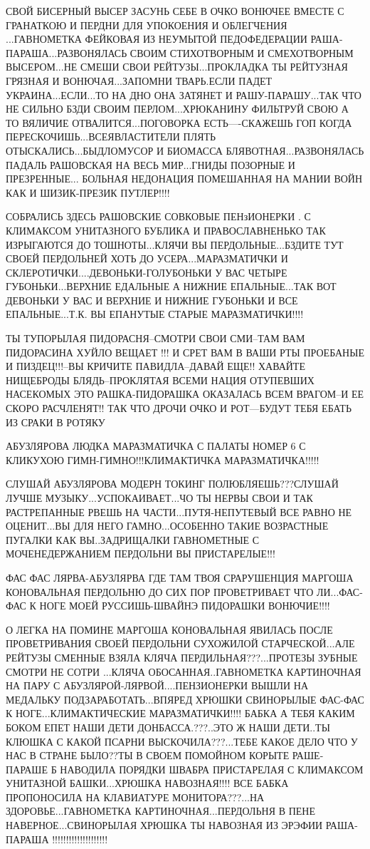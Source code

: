 СВОЙ БИСЕРНЫЙ ВЫСЕР ЗАСУНЬ СЕБЕ В ОЧКО ВОНЮЧЕЕ ВМЕСТЕ С ГРАНАТКОЮ И ПЕРДНИ ДЛЯ
УПОКОЕНИЯ И ОБЛЕГЧЕНИЯ ...ГАВНОМЕТКА ФЕЙКОВАЯ ИЗ НЕУМЫТОЙ ПЕДОФЕДЕРАЦИИ
РАША-ПАРАША...РАЗВОНЯЛАСЬ СВОИМ СТИХОТВОРНЫМ И СМЕХОТВОРНЫМ ВЫСЕРОМ...НЕ СМЕШИ
СВОИ РЕЙТУЗЫ...ПРОКЛАДКА ТЫ РЕЙТУЗНАЯ ГРЯЗНАЯ И ВОНЮЧАЯ...ЗАПОМНИ ТВАРЬ.ЕСЛИ
ПАДЕТ УКРАИНА...ЕСЛИ...ТО НА ДНО ОНА ЗАТЯНЕТ И РАШУ-ПАРАШУ...ТАК ЧТО НЕ СИЛЬНО
БЗДИ СВОИМ ПЕРЛОМ...ХРЮКАНИНУ ФИЛЬТРУЙ СВОЮ А ТО ВЯЛИЧИЕ ОТВАЛИТСЯ...ПОГОВОРКА
ЕСТЬ----СКАЖЕШЬ ГОП КОГДА ПЕРЕСКОЧИШЬ...ВСЕЯВЛАСТИТЕЛИ ПЛЯТЬ
ОТЫСКАЛИСЬ...БЫДЛОМУСОР И БИОМАССА БЛЯВОТНАЯ...РАЗВОНЯЛАСЬ ПАДАЛЬ РАШОВСКАЯ НА
ВЕСЬ МИР...ГНИДЫ ПОЗОРНЫЕ И ПРЕЗРЕННЫЕ... БОЛЬНАЯ НЕДОНАЦИЯ ПОМЕШАННАЯ НА МАНИИ
ВОЙН КАК И ШИЗИК-ПРЕЗИК ПУТЛЕР!!!!                              

СОБРАЛИСЬ ЗДЕСЬ РАШОВСКИЕ СОВКОВЫЕ ПЕНзИОНЕРКИ . С КЛИМАКСОМ УНИТАЗНОГО БУБЛИКА
И ПРАВОСЛАВНЕНЬКО ТАК ИЗРЫГАЮТСЯ ДО ТОШНОТЫ...КЛЯЧИ ВЫ ПЕРДОЛЬНЫЕ...БЗДИТЕ ТУТ
СВОЕЙ ПЕРДОЛЬНЕЙ ХОТЬ ДО УСЕРА...МАРАЗМАТИЧКИ И
СКЛЕРОТИЧКИ....ДЕВОНЬКИ-ГОЛУБОНЬКИ У ВАС ЧЕТЫРЕ ГУБОНЬКИ...ВЕРХНИЕ ЕДАЛЬНЫЕ А
НИЖНИЕ ЕПАЛЬНЫЕ...ТАК ВОТ ДЕВОНЬКИ У ВАС И ВЕРХНИЕ И НИЖНИЕ ГУБОНЬКИ И ВСЕ
ЕПАЛЬНЫЕ...Т.К. ВЫ ЕПАНУТЫЕ СТАРЫЕ МАРАЗМАТИЧКИ!!!!            

ТЫ ТУПОРЫЛАЯ ПИДОРАСНЯ--СМОТРИ СВОИ СМИ--ТАМ ВАМ ПИДОРАСИНА ХУЙЛО ВЕЩАЕТ !!! И
СРЕТ ВАМ В ВАШИ РТЫ ПРОЕБАНЫЕ И ПИЗДЕЦ!!!--ВЫ КРИЧИТЕ ПАВИДЛА--ДАВАЙ ЕЩЕ!!
ХАВАЙТЕ НИЩЕБРОДЫ БЛЯДЬ--ПРОКЛЯТАЯ ВСЕМИ НАЦИЯ ОТУПЕВШИХ НАСЕКОМЫХ ЭТО
РАШКА-ПИДОРАШКА ОКАЗАЛАСЬ ВСЕМ ВРАГОМ--И ЕЕ СКОРО РАСЧЛЕНЯТ!! ТАК ЧТО ДРОЧИ
ОЧКО И РОТ---БУДУТ ТЕБЯ ЕБАТЬ ИЗ СРАКИ В РОТЯКУ

АБУЗЛЯРОВА ЛЮДКА МАРАЗМАТИЧКА С ПАЛАТЫ НОМЕР 6 С КЛИКУХОЮ
ГИМН-ГИМНО!!!КЛИМАКТИЧКА МАРАЗМАТИЧКА!!!!! 

СЛУШАЙ АБУЗЛЯРОВА МОДЕРН ТОКИНГ ПОЛЮБЛЯЕШЬ???СЛУШАЙ ЛУЧШЕ
МУЗЫКУ...УСПОКАИВАЕТ...ЧО ТЫ НЕРВЫ СВОИ И ТАК РАСТРЕПАННЫЕ РВЕШЬ НА
ЧАСТИ...ПУТЯ-НЕПУТЕВЫЙ ВСЕ РАВНО НЕ ОЦЕНИТ...ВЫ ДЛЯ НЕГО ГАМНО...ОСОБЕННО ТАКИЕ
ВОЗРАСТНЫЕ ПУГАЛКИ КАК ВЫ..ЗАДРИЩАЛКИ ГАВНОМЕТНЫЕ С МОЧЕНЕДЕРЖАНИЕМ ПЕРДОЛЬНИ
ВЫ ПРИСТАРЕЛЫЕ!!! 

ФАС ФАС ЛЯРВА-АБУЗЛЯРВА ГДЕ ТАМ ТВОЯ СРАРУШЕНЦИЯ МАРГОША КОНОВАЛЬНАЯ ПЕРДОЛЬНЮ
ДО СИХ ПОР ПРОВЕТРИВАЕТ ЧТО ЛИ...ФАС-ФАС К НОГЕ МОЕЙ РУССИШЬ-ШВАЙНЭ ПИДОРАШКИ
ВОНЮЧИЕ!!!! 

О ЛЕГКА НА ПОМИНЕ МАРГОША КОНОВАЛЬНАЯ ЯВИЛАСЬ ПОСЛЕ ПРОВЕТРИВАНИЯ СВОЕЙ
ПЕРДОЛЬНИ СУХОЖИЛОЙ СТАРЧЕСКОЙ...АЛЕ РЕЙТУЗЫ СМЕННЫЕ ВЗЯЛА КЛЯЧА
ПЕРДИЛЬНАЯ???...ПРОТЕЗЫ ЗУБНЫЕ СМОТРИ НЕ СОТРИ ...КЛЯЧА ОБОСАННАЯ..ГАВНОМЕТКА
КАРТИНОЧНАЯ НА ПАРУ С АБУЗЛЯРОЙ-ЛЯРВОЙ....ПЕНЗИОНЕРКИ ВЫШЛИ НА МЕДАЛЬКУ
ПОДЗАРАБОТАТЬ...ВПЯРЕД ХРЮШКИ СВИНОРЫЛЫЕ ФАС-ФАС К НОГЕ...КЛИМАКТИЧЕСКИЕ
МАРАЗМАТИЧКИ!!!!
БАБКА А ТЕБЯ КАКИМ БОКОМ ЕПЕТ НАШИ ДЕТИ ДОНБАССА.???..ЭТО Ж НАШИ ДЕТИ..ТЫ
КЛЮШКА С КАКОЙ ПСАРНИ ВЫСКОЧИЛА???...ТЕБЕ КАКОЕ ДЕЛО ЧТО У НАС В СТРАНЕ
БЫЛО??ТЫ В СВОЕМ ПОМОЙНОМ КОРЫТЕ РАШЕ-ПАРАШЕ Б НАВОДИЛА ПОРЯДКИ ШВАБРА
ПРИСТАРЕЛАЯ С КЛИМАКСОМ УНИТАЗНОЙ БАШКИ...ХРЮШКА НАВОЗНАЯ!!!!     ВСЕ БАБКА
ПРОПОНОСИЛА НА КЛАВИАТУРЕ МОНИТОРА???...НА ЗДОРОВЬЕ...ГАВНОМЕТКА
КАРТИНОЧНАЯ...ПЕРДОЛЬНЯ В ПЕНЕ НАВЕРНОЕ...СВИНОРЫЛАЯ ХРЮШКА ТЫ НАВОЗНАЯ ИЗ
ЭРЭФИИ РАША-ПАРАША !!!!!!!!!!!!!!!!!!!!       

